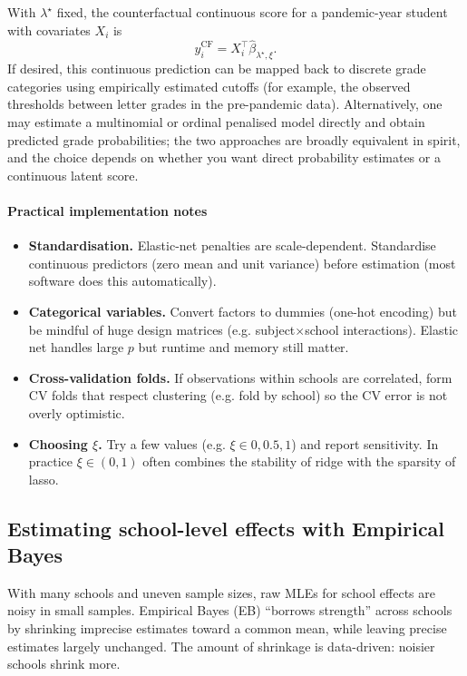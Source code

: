 With $\lambda^{\star}$ fixed, the counterfactual continuous score for a pandemic-year student with covariates $X_i$ is
\begin{equation}
    \widehat{y}_i^{\mathrm{CF}} = X_i^{\top}\hat\beta_{\lambda^{\star},\xi}.
\end{equation}
If desired, this continuous prediction can be mapped back to discrete grade categories using empirically estimated cutoffs (for example, the observed thresholds between letter grades in the pre-pandemic data). Alternatively, one may estimate a multinomial or ordinal penalised model directly and obtain predicted grade probabilities; the two approaches are broadly equivalent in spirit, and the choice depends on whether you want direct probability estimates or a continuous latent score.

\paragraph{Practical implementation notes} \begin{itemize} \item \textbf{Standardisation.} Elastic-net penalties are scale-dependent. Standardise continuous predictors (zero mean and unit variance) before estimation (most software does this automatically). \item \textbf{Categorical variables.} Convert factors to dummies (one-hot encoding) but be mindful of huge design matrices (e.g. subject$\times$school interactions). Elastic net handles large $p$ but runtime and memory still matter. \item \textbf{Cross-validation folds.} If observations within schools are correlated, form CV folds that respect clustering (e.g. fold by school) so the CV error is not overly optimistic. \item \textbf{Choosing $\xi$.} Try a few values (e.g. $\xi\in{0,0.5,1}$) and report sensitivity. In practice $\xi\in(0,1)$ often combines the stability of ridge with the sparsity of lasso. \end{itemize}


\subsection{Estimating school-level effects with Empirical Bayes}\label{app:eb}


With many schools and uneven sample sizes, raw MLEs for school effects are noisy in small samples. Empirical Bayes (EB) ``borrows strength'' across schools by shrinking imprecise estimates toward a common mean, while leaving precise estimates largely unchanged. The amount of shrinkage is data-driven: noisier schools shrink more.

